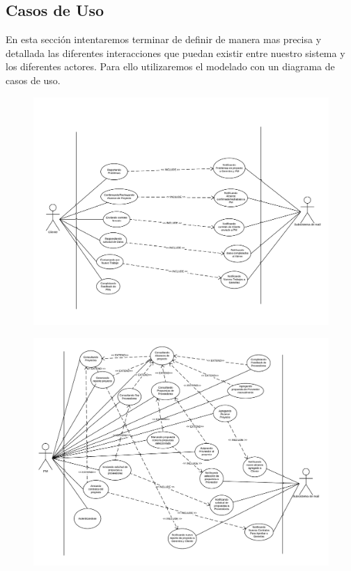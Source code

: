 \subsection{Casos de Uso}

En esta sección intentaremos terminar de definir de manera mas precisa y detallada las diferentes interacciones que puedan existir entre nuestro sistema y los diferentes actores. Para ello utilizaremos el modelado con un diagrama de casos de uso.

\begin{figure}[H]
\includegraphics[width=\linewidth]{cu1.pdf}
\end{figure}
\begin{figure}[H]
\includegraphics[width=\linewidth]{cu2.pdf}
\end{figure}
